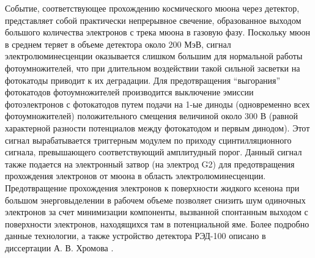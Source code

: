 	
Событие, соответствующее прохождению космического мюона через детектор, представляет собой практически непрерывное свечение, образованное выходом большого количества электронов с трека мюона в газовую фазу. Поскольку мюон  в среднем теряет в объеме детектора около 200 МэВ, сигнал электролюминесценции оказывается слишком большим для нормальной работы фотоумножителей, что при длительном воздействии такой сильной засветки на фотокатоды приводит к их деградации. Для предотвращения “выгорания” фотокатодов фотоумножителей производится выключение эмиссии фотоэлектронов с фотокатодов путем подачи на 1-ые диноды (одновременно всех фотоумножителей) положительного смещения величиной около 300 В (равной характерной разности потенциалов между фотокатодом и первым динодом). Этот сигнал вырабатывается триггерным модулем по приходу сцинтилляционного сигнала, превышающего соответствующий амплитудный порог. Данный сигнал также подается на электронный затвор (на электрод G2) для предотвращения прохождения электронов от мюона в область электролюминесценции. Предотвращение прохождения электронов к поверхности жидкого ксенона при большом энерговыделении в рабочем объеме позволяет снизить шум одиночных электронов за счет минимизации компоненты, вызванной спонтанным выходом с поверхности электронов, находящихся там в потенциальной яме. Более подробно данные технологии, а также устройство детектора РЭД-100 описано в диссертации А. В. Хромова \cite{Khromov_thesis}.

